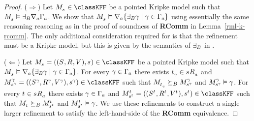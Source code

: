 \begin{proof}
($\Rightarrow$) Let $\kPModel{\kStateS} \in \classKFF$ be a pointed Kripke model such that $\kPModel{\kStateS} \entails \somerefsBs \coversA \Gamma_\agentA$.
We show that $\kPModel{\kStateS} \entails \coversA \{\somerefsBs \gamma \mid \gamma \in \Gamma_\agentA\}$ using essentially the same reasoning reasoning as in the proof of soundness of {\bf RComm} in Lemma~\ref{rml-k-rcomm}.
The only additional consideration required for \logicRmlKFF{} is that the refinement must be a \classKFF{} Kripke model, but this is given by the semantics of $\somerefsBs$ in \logicRmlKFF{}.

($\Leftarrow$) Let $\kPModelAndTuple{\kStateS} \in \classKFF$ be a pointed Kripke model such that $\kPModel{\kStateS} \entails \coversA \{\somerefsBs \gamma \mid \gamma \in \Gamma_\agentA\}$.
For every $\gamma \in \Gamma_\agentA$ there exists $\kStateT_\gamma \in \kSuccessorsA{\kStateS}$ and $\kPModelAndTuple[\gamma]{\kStateS[\gamma]} \in \classKFF$ such that $\kPModel{\kStateT_\gamma} \simulatesBs \kPModel[\gamma]{\kStateS[\gamma]}$ and $\kPModel[\gamma]{\kStateS[\gamma]} \entails \gamma$.
For every $\kStateT \in \kSuccessorsA{\kStateS}$ there exists $\gamma \in \Gamma_\agentA$ and $\kPModelAndTuple[\kStateT]{\kStateS[\kStateT]} \in \classKFF$ such that $\kPModel{\kStateT} \simulatesBs \kPModel[\kStateT]{\kStateS[\kStateT]}$ and $\kPModel[\kStateT]{\kStateS[\kStateT]} \entails \gamma$.
We use these refinements to construct a single larger refinement to satisfy the left-hand-side of the {\bf RComm} equivalence.


\end{proof}
